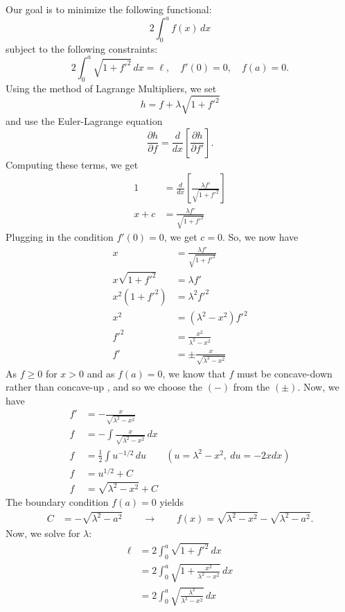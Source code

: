 \documentclass[10pt,letterpaper]{report}
\newcommand{\so}{\qquad \rightarrow \qquad}
\newcommand{\pp}[2]{\frac{\partial{#1}}{\partial{#2}}}
\begin{document}
\begin{enumerate}
Our goal is to minimize the following functional:
\[
2\int_{0}^af(x)\,dx
\]
subject to the following constraints:
\[
2\int_0^a \sqrt{1 + f'^2}\,dx = \ell, \quad f'(0) = 0,\quad f(a) = 0.
\]
Using the method of Lagrange Multipliers, we set
\[
h = f + \lambda \sqrt{1 + f'^2}
\]
and use the Euler-Lagrange equation
\[
\pp{h}{f} = \frac{d}{dx}\left[\pp{h}{f'}\right].
\]
Computing these terms, we get
\begin{align*}
    1 &= \frac{d}{dx}\left[\frac{\lambda f'}{\sqrt{1 + f'^2}}\right] \\
    x + c &= \frac{\lambda f'}{\sqrt{1 + f'^2}}
\end{align*}
Plugging in the condition $f'(0) = 0$, we get $c = 0$. So, we now have
\begin{align*}
    x &= \frac{\lambda f'}{\sqrt{1 + f'^2}} \\
    x\sqrt{1 + f'^2} &= \lambda f' \\
    x^2\left(1 + f'^2\right) &= \lambda^2 f'^2 \\
    x^2 &= \left(\lambda^2 - x^2\right)f'^2 \\
    f'^2 &= \frac{x^2}{\lambda^2 - x^2} \\
    f' &= \pm \frac{x}{\sqrt{\lambda^2 - x^2}}
\end{align*}
As $f \geq 0$ for $x > 0$ and as $f(a) = 0$, we know that $f$ must be concave-down rather than concave-up , and so we choose the $(-)$ from the $(\pm)$. Now, we have
\begin{align*}
    f' &= - \frac{x}{\sqrt{\lambda^2 - x^2}} \\
    f &= - \int \frac{x}{\sqrt{\lambda^2 - x^2}} \,dx \\
    f &= \frac{1}{2}\int u^{-1/2}\,du &(u = \lambda^2 - x^2,\ du = -2xdx) \\
    f &= u^{1/2} + C \\
    f &= \sqrt{\lambda^2 - x^2} + C
\end{align*}
The boundary condition $f(a) = 0$ yields
\begin{align*}
    C &= - \sqrt{\lambda^2 - a^2} \so f(x) = \sqrt{\lambda^2 - x^2}- \sqrt{\lambda^2 - a^2}.
\end{align*}
Now, we solve for $\lambda:$
\begin{align*}
    \ell &= 2\int_0^a \sqrt{1 + f'^2}\,dx \\
    &= 2\int_0^a \sqrt{1 + \frac{x^2}{\lambda^2 - x^2}}\,dx \\
    &= 2\int_0^a \sqrt{\frac{\lambda^2}{\lambda^2 - x^2}}\,dx\\

\end{align*}
\end{enumerate}
\end{document}

